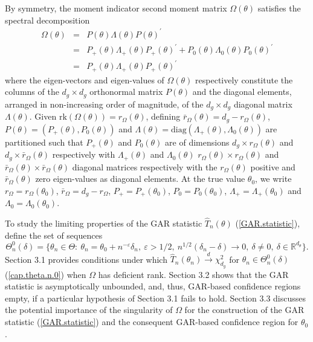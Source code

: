 \documentclass[hidelinks, 11 pt, a4paper, pdflatex]{article}
\begin{document}
{  By symmetry, the moment indicator second moment matrix $\Omega(\theta)$ satisfies the spectral decomposition
   \begin{eqnarray}
    \Omega(\theta) & = & P(\theta)\Lambda(\theta)P(\theta)^{\prime} \nonumber \\
                   & = & P_{+}(\theta)\Lambda_{+}(\theta)P_{+}(\theta)^{\prime} + P_{0}(\theta)\Lambda_{0}(\theta)P_{0}(\theta)^{\prime} \nonumber \\
                   & = & P_{+}(\theta)\Lambda_{+}(\theta)P_{+}(\theta)^{\prime} \label{sp.decompn}
   \end{eqnarray}
  where the eigen-vectors and eigen-values of $\Omega(\theta)$ respectively constitute the columns of the $d_{g} \times d_{g}$ orthonormal matrix $P(\theta)$ and the diagonal elements, arranged in non-increasing order of magnitude, of the $d_{g} \times d_{g}$ diagonal matrix $\Lambda(\theta)$. Given $\mathrm{rk}(\Omega(\theta)) = r_{\Omega}(\theta)$, defining $\bar{r}_{\Omega}(\theta) = d_{g} - r_{\Omega}(\theta)$, $P(\theta) = (P_{+}(\theta),P_{0}(\theta))$ and $\Lambda(\theta) = \mathrm{diag}(\Lambda_{+}(\theta),\Lambda_{0}(\theta))$ are partitioned such that $P_{+}(\theta)$ and $P_{0}(\theta)$ are of dimensions $d_{g} \times r_{\Omega}(\theta)$ and $d_{g} \times \bar{r}_{\Omega}(\theta)$ respectively with $\Lambda_{+}(\theta)$ and $\Lambda_{0}(\theta)$ $r_{\Omega}(\theta) \times r_{\Omega}(\theta)$ and $\bar{r}_{\Omega}(\theta) \times \bar{r}_{\Omega}(\theta)$ diagonal matrices respectively with the $r_{\Omega}(\theta)$ positive and $\bar{r}_{\Omega}(\theta)$ zero eigen-values as diagonal elements. At the true value $\theta_0$, we write $r_{\Omega} = r_{\Omega}(\theta_0)$, $\bar{r}_{\Omega} = d_{g} - r_{\Omega}$, $P_{+} = P_{+}(\theta_0)$, $P_{0} = P_{0}(\theta_0)$, $\Lambda_{+} = \Lambda_{+}(\theta_0)$ and $\Lambda_{0} = \Lambda_{0}(\theta_0)$.

  To study the limiting properties of the GAR statistic $\hat{T}_n(\theta)$ (\ref{GAR.statistic}), define the set of sequences
   \begin{equation} \label{cap.theta.n.0}
    \Theta_n^{0}(\delta) = \{\theta_n \in \Theta:~\theta_n = \theta_0 + n^{-\varepsilon}\delta_n,~\varepsilon > 1/2,~n^{1/2}(\delta_n - \delta) \rightarrow 0,~\delta \neq 0,~\delta \in \mathbb{R}^{d_{\theta}}\}.
   \end{equation}
  \indent Section 3.1 provides conditions under which $\hat{T}_n(\theta_n) \overset{d}{\rightarrow} \chi_{d_{g}}^{2}$ for $\theta_{n} \in \Theta_{n}^{0}(\delta)$ (\ref{cap.theta.n.0}) when $\Omega$ has deficient rank. Section 3.2 shows that the GAR statistic is asymptotically unbounded, and, thus, GAR-based confidence regions empty, if a particular hypothesis of Section 3.1 fails to hold. Section 3.3 discusses the potential importance of the singularity of $\Omega$ for the construction of the GAR statistic (\ref{GAR.statistic}) and the consequent GAR-based confidence region for $\theta_0$.

}
\end{document}
